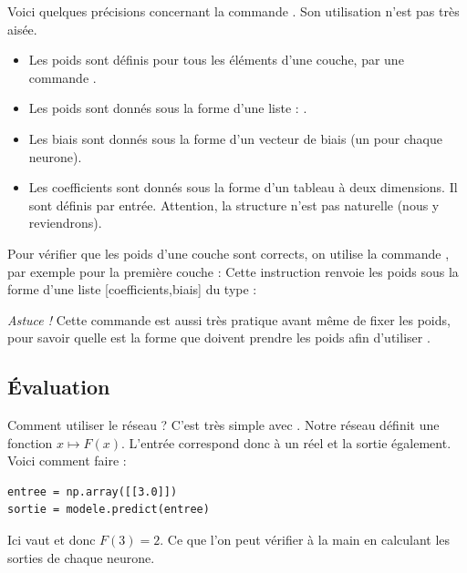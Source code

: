 \documentclass[11pt,class=report,crop=false]{standalone}
\begin{document}
Voici quelques précisions concernant la commande . Son utilisation n'est pas très aisée. 
\begin{itemize}
  \item Les poids sont définis pour tous les éléments d'une couche, par une commande .
  \item Les poids sont donnés sous la forme d'une liste : .
  \item Les biais sont donnés sous la forme d'un vecteur de biais (un pour chaque neurone).
  \item Les coefficients sont donnés sous la forme d'un tableau à deux dimensions. Il sont définis par entrée. Attention, la structure n'est pas naturelle (nous y reviendrons).
\end{itemize}

Pour vérifier que les poids d'une couche sont corrects, on utilise la commande , par exemple pour la première couche :
Cette instruction renvoie les poids sous la forme d'une liste [coefficients,biais] du type :
\mycenterline{\ci{[  [[ 1.  -0.5]],  [-1.  1.]  ]}}

\emph{Astuce !} Cette commande est aussi très pratique avant même de fixer les poids, pour savoir quelle est la forme que doivent prendre les poids afin d'utiliser .


\subsection{Évaluation}

Comment utiliser le réseau ? C'est très simple avec .
 Notre réseau définit une fonction $x \mapsto F(x)$. L'entrée correspond donc à un réel et la sortie également. Voici comment faire :
\begin{lstlisting}
entree = np.array([[3.0]])
sortie = modele.predict(entree)
\end{lstlisting}
Ici  vaut \ci{[[2.0]]} et donc 
$F(3) = 2$. Ce que l'on peut vérifier à la main en calculant les sorties de chaque neurone.



\end{document}
